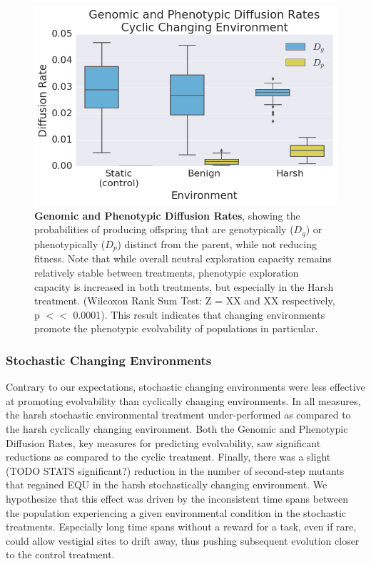 \documentclass[10pt,letterpaper]{article}
\begin{document}
\begin{figure}[!h] %

\includegraphics[trim={0.2cm 0 0.4cm 0.25cm},clip,width=1\columnwidth]{figures/CCE_D_g_D_p__box.png}
\caption{{\bf Genomic and Phenotypic Diffusion Rates}, showing the probabilities of producing offspring that are genotypically ($D_g$) or phenotypically ($D_p$) distinct from the parent, while not reducing fitness.
Note that while overall neutral exploration capacity remains relatively stable between treatments, phenotypic exploration capacity is increased in both treatments, but especially in the Harsh treatment. (Wilcoxon Rank Sum Test: Z = XX and XX respectively, p $<<$ 0.0001). This result indicates that changing environments promote the phenotypic evolvability of populations in particular.
}\label{fig:CCE_diffusion_rate}

\end{figure}
\subsubsection*{Stochastic Changing Environments}

Contrary to our expectations, stochastic changing environments were less effective at promoting evolvability than cyclically changing environments. In all measures, the harsh stochastic environmental treatment under-performed as compared to the harsh cyclically changing environment. Both the Genomic and Phenotypic Diffusion Rates, key measures for predicting evolvability, saw significant reductions as compared to the cyclic treatment. Finally, there was a slight (TODO STATS significant?) reduction in the number of second-step mutants that regained EQU in the harsh stochastically changing environment. We hypothesize that this effect was driven by the inconsistent time spans between the population experiencing a given environmental condition in the stochastic treatments. Especially long time spans without a reward for a task, even if rare, could allow vestigial sites to drift away, thus pushing subsequent evolution closer to the control treatment.
\end{document}
